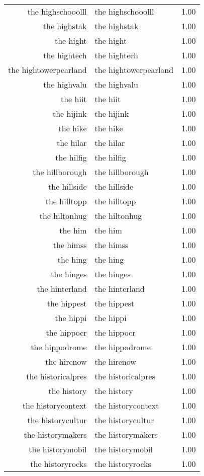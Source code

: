 \begin{table}[ht]
\begin{tabular}{rlr}
  the highschooolll & the highschooolll & 1.00 \\ 
  the highstak & the highstak & 1.00 \\ 
  the hight & the hight & 1.00 \\ 
  the hightech & the hightech & 1.00 \\ 
  the hightowerpearland & the hightowerpearland & 1.00 \\ 
  the highvalu & the highvalu & 1.00 \\ 
  the hiit & the hiit & 1.00 \\ 
  the hijink & the hijink & 1.00 \\ 
  the hike & the hike & 1.00 \\ 
  the hilar & the hilar & 1.00 \\ 
  the hilfig & the hilfig & 1.00 \\ 
  the hillborough & the hillborough & 1.00 \\ 
  the hillside & the hillside & 1.00 \\ 
  the hilltopp & the hilltopp & 1.00 \\ 
  the hiltonhug & the hiltonhug & 1.00 \\ 
  the him & the him & 1.00 \\ 
  the himss & the himss & 1.00 \\ 
  the hing & the hing & 1.00 \\ 
  the hinges & the hinges & 1.00 \\ 
  the hinterland & the hinterland & 1.00 \\ 
  the hippest & the hippest & 1.00 \\ 
  the hippi & the hippi & 1.00 \\ 
  the hippocr & the hippocr & 1.00 \\ 
  the hippodrome & the hippodrome & 1.00 \\ 
  the hirenow & the hirenow & 1.00 \\ 
  the historicalpres & the historicalpres & 1.00 \\ 
  the history & the history & 1.00 \\ 
  the historycontext & the historycontext & 1.00 \\ 
  the historycultur & the historycultur & 1.00 \\ 
  the historymakers & the historymakers & 1.00 \\ 
  the historymobil & the historymobil & 1.00 \\ 
  the historyrocks & the historyrocks & 1.00 \\ 

\end{tabular}
\end{table}
